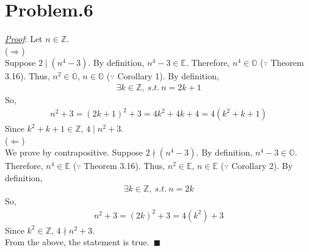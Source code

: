 \documentclass[12pt]{article}
\begin{document}
\section*{Problem.6}
\underline{\textit{Proof}}: Let $n \in \mathbb{Z}$.\\[1em]
($\Rightarrow$)\\[1em]
Suppose $ 2 \mid (n^4 - 3)$. By definition, $n^4-3 \in \mathbb{E}$. Therefore, $n^4 \in \mathbb{O}$ ($\because$ Theorem 3.16). Thus, $n^2 \in \mathbb{O}$, $n \in \mathbb{O}$ ($\because$ Corollary 1). By definition,
\begin{gather*}
\exists k \in \mathbb{Z},~s.t.~ n = 2k + 1
\end{gather*}
So,
\begin{gather*}
n^2 + 3 = (2k + 1)^2 + 3 = 4k^2 + 4k + 4 = 4(k^2 + k + 1)
\end{gather*}
Since $k^2 + k + 1 \in \mathbb{Z}$, $4 \mid n^2 + 3$.\\[1em]
($\Leftarrow$)\\[1em]
We prove by contrapositive. Suppose $ 2 \nmid (n^4 - 3)$. By definition, $n^4-3 \in \mathbb{O}$. Therefore, $n^4 \in \mathbb{E}$ ($\because$ Theorem 3.16). Thus, $n^2 \in \mathbb{E}$, $n \in \mathbb{E}$ ($\because$ Corollary 2). By definition,
\begin{gather*}
\exists k \in \mathbb{Z},~s.t.~ n = 2k
\end{gather*}
So,
\begin{gather*}
n^2 + 3 = (2k)^2 + 3 = 4(k^2) + 3
\end{gather*}
Since $k^2 \in \mathbb{Z}$, $4 \nmid n^2 + 3$.\\[1em]
From the above, the statement is true.~$\blacksquare$
\end{document}
